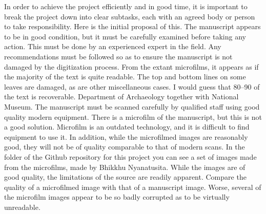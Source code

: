 {}In order to achieve the project efficiently and in good time, it is important to break the project down into clear subtasks, each with an agreed body or person to take responsibility. Here is the initial proposal of this.\markdownRendererInterblockSeparator
{}\markdownRendererInterblockSeparator
{}The manuscript appears to be in good condition, but it must be carefully examined before taking any action. This must be done by an experienced expert in the field. Any recommendations must be followed so as to ensure the manuscript is not damaged by the digitization process.\markdownRendererInterblockSeparator
{}From the extant microfilms, it appears as if the majority of the text is quite readable. The top and bottom lines on some leaves are damaged, as are other miscellaneous cases. I would guess that 80\markdownRendererPercentSign{}–90\markdownRendererPercentSign{} of the text is recoverable.\markdownRendererInterblockSeparator
{}\markdownRendererBlockQuoteBegin
{} Department of Archaeology together with National Museum.
\markdownRendererBlockQuoteEnd \markdownRendererInterblockSeparator
{}\markdownRendererInterblockSeparator
{}The manuscript must be scanned carefully by qualified staff using good quality modern equipment.\markdownRendererInterblockSeparator
{}There is a microfilm of the manuscript, but this is not a good solution. Microfilm is an outdated technology, and it is difficult to find equipment to use it. In addition, while the microfilmed images are reasonably good, they will not be of quality comparable to that of modern scans. In the  folder of the Github repository for this project you can see a set of images made from the microfilms, made by Bhikkhu Nyanatusita. While the images are of good quality, the limitations of the source are readily apparent. Compare the quality of a microfilmed image with that of a manuscript image.\markdownRendererInterblockSeparator
{}\markdownRendererInterblockSeparator
{}\markdownRendererInterblockSeparator
{}Worse, several of the microfilm images appear to be so badly corrupted as to be virtually unreadable.\markdownRendererInterblockSeparator
